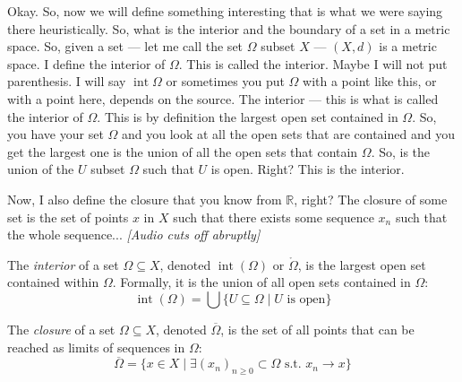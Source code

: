 \begin{spoken-clean}[00:24:23 - 00:27:06]
Okay. So, now we will define something interesting that is what we were saying there heuristically. So, what is the interior and the boundary of a set in a metric space. So, given a set --- let me call the set $\Omega$ subset $X$ --- $(X, d)$ is a metric space. I define the interior of $\Omega$. This is called the interior. Maybe I will not put parenthesis. I will say $\operatorname{int} \Omega$ or sometimes you put $\Omega$ with a point like this, or with a point here, depends on the source. The interior --- this is what is called the interior of $\Omega$. This is by definition the largest open set contained in $\Omega$. So, you have your set $\Omega$ and you look at all the open sets that are contained and you get the largest one is the union of all the open sets that contain $\Omega$. So, is the union of the $U$ subset $\Omega$ such that $U$ is open. Right? This is the interior.

Now, I also define the closure that you know from $\mathbb{R}$, right? The closure of some set is the set of points $x$ in $X$ such that there exists some sequence $x_n$ such that the whole sequence... \textit{[Audio cuts off abruptly]}
\end{spoken-clean}

\begin{math-stroke}
\setcounter{theorem}{45}
\begin{definition}[Interior]\label{def:interior}
The \emph{interior} of a set $\Omega \subseteq X$, denoted $\operatorname{int}(\Omega)$ or $\mathring{\Omega}$, is the largest open set contained within $\Omega$. Formally, it is the union of all open sets contained in $\Omega$:
\[ \operatorname{int}(\Omega) = \bigcup \{ U \subseteq \Omega \mid U \text{ is open} \} \]
\end{definition}

\begin{definition}[Closure]\label{def:closure}
The \emph{closure} of a set $\Omega \subseteq X$, denoted $\overline{\Omega}$, is the set of all points that can be reached as limits of sequences in $\Omega$:
\[ \overline{\Omega} = \{ x \in X \mid \exists (x_n)_{n \ge 0} \subset \Omega \text{ s.t. } x_n \to x \} \]
\end{definition}
\end{math-stroke}

